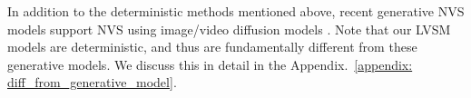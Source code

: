 In addition to the deterministic methods mentioned above, recent generative NVS models support NVS using image/video diffusion models \citep{watson2022novel, liu2023zero1to3,gao2024cat3d,zheng2024free3d,kong2024eschernet,voleti2025sv3d}. Note that our LVSM models are deterministic, and thus are fundamentally different from these generative models.
We discuss this in detail in the Appendix.~\ref{appendix: diff_from_generative_model}.



